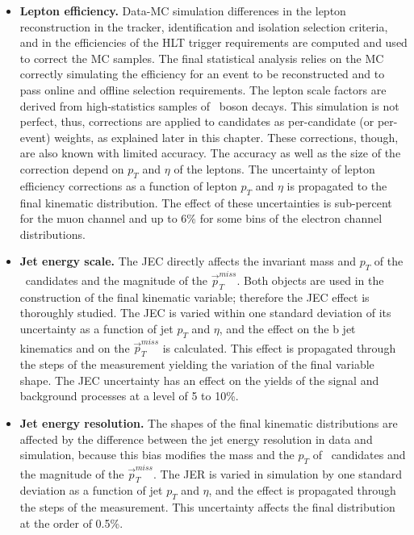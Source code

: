 \begin{itemize}

\item{\bf Lepton efficiency.} 
Data-MC simulation differences in the lepton reconstruction in the tracker, identification and isolation selection criteria, and in the efficiencies of the HLT trigger requirements are computed and used to correct the MC samples. The final statistical analysis relies on the MC correctly simulating the efficiency for an event to be reconstructed and to pass online and offline selection requirements. The lepton scale factors are derived from high-statistics samples of \PZ~boson decays. This simulation is not perfect, thus, corrections are applied to candidates as per-candidate (or per-event) weights, as explained later in this chapter. These corrections, though, are also known with limited accuracy. The accuracy as well as the size of the correction depend on $p_T$ and $\eta$ of the leptons. The uncertainty of lepton efficiency corrections as a function of lepton $p_T$ and $\eta$ is propagated to the final kinematic distribution. The effect of these uncertainties is sub-percent for the muon channel and up to 6\% for some bins of the electron channel \mTHH distributions.

\item{\bf Jet energy scale.}
The JEC directly affects the invariant mass and $p_T$ of the \HBB~candidates and the magnitude of the $\vec{p}^{miss}_T$. Both objects are used in the construction of the final kinematic variable; therefore the JEC effect is thoroughly studied. The JEC is varied within one standard deviation of its uncertainty as a function of jet $p_T$ and $\eta$, and the effect on the b jet kinematics and on the $\vec{p}^{miss}_T$ is calculated. This effect is propagated through the steps of the measurement yielding the variation of the final variable shape. The JEC uncertainty has an effect on the yields of the signal and background processes at a level of 5 to 10\%.

\item{\bf Jet energy resolution.} 
The shapes of the final kinematic distributions are affected by the difference between the jet energy
resolution in data and simulation, because this bias modifies the mass and the $p_T$ of \HBB~candidates and the magnitude of the $\vec{p}^{miss}_T$. The JER is varied in simulation by one standard deviation as a function of jet $p_T$ and $\eta$, and the effect is propagated through the steps of the measurement. This uncertainty affects the final distribution at the order of 0.5\%.


\end{itemize}
